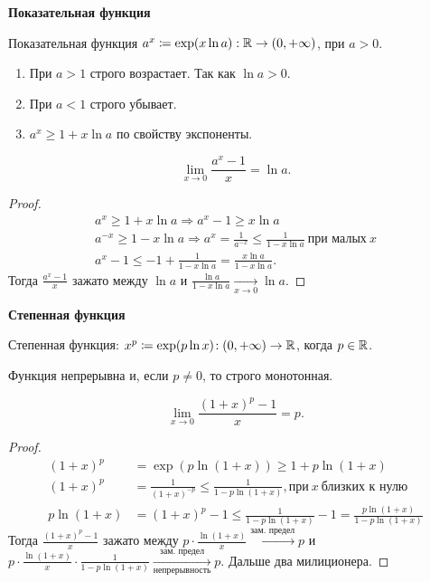 \textbf{Показательная функция}
\begin{definition}
    Показательная функция $a^x \coloneqq \exp(x \ln a): \mathbb{R} \to (0, +\infty)$, при $a > 0$.
\end{definition}
\begin{properties}
    \begin{enumerate}
        \item При $a > 1$ строго возрастает. Так как $\ln a > 0$. 
        \item При $a < 1$ строго убывает.
        \item  $a^x \ge 1 + x \ln a$ по свойству экспоненты.
    \end{enumerate}
\end{properties}
\begin{theorem}
     \[
         \lim_{x \to 0} \frac{a^x - 1}{x} = \ln a
    .\] 
\end{theorem}
\begin{proof}
    \begin{align*}
        a^x \ge 1 + x \ln a \Rightarrow  a^x - 1 \ge x \ln a \\
        a^{-x} \ge 1 - x \ln a \Rightarrow a^x = \frac{1}{a^{-x}} \le \frac{1}{1 - x \ln a}\ \text{при малых}\ x \\
        a^x - 1 \le -1 + \frac{1}{1 - x \ln a} = \frac{x \ln a}{1 - x \ln a}.
        \end{align*}
        Тогда $\frac{a^x - 1}{x}$ зажато между $\ln a$ и  $\frac{\ln a}{1 - x \ln a} \xrightarrow[x \to 0]{} \ln a$. 
\end{proof}

\textbf{Степенная функция}
\begin{definition}
    Степенная функция: $x^p \coloneqq \exp(p \ln x)\!: (0, +\infty) \to \mathbb{R}$, когда  $p \in \mathbb{R}$.

    Функция непрерывна и, если  $p \neq 0$, то строго монотонная.
\end{definition}

\begin{theorem}
    \[
        \lim_{x\to 0} \frac{(1+x)^p - 1}{x} = p
    .\] 
\end{theorem}
\begin{proof}
    \begin{align*}
        (1+x)^p &= \exp(p \ln(1+x))  \ge 1 + p \ln(1+x) \\
        (1+x)^p &= \frac{1}{(1+x)^{-p}} \le \frac{1}{1 - p \ln (1+x)}, \text{при}\ x\ \text{близких к нулю}\\
        p \ln (1+x) &= (1+x)^p - 1 \le \frac{1}{1-p\ln(1+x)} - 1 = \frac{p\ln(1+x)}{1 - p \ln(1+x)}
    \end{align*}
    Тогда $\frac{(1+x)^p - 1}{x}$ зажато между $p \cdot \frac{\ln(1+x)}{x} \xrightarrow{\text{зам. предел}}p$ и $p \cdot \frac{\ln(1+x)}{x} \cdot \frac{1}{1 - p \ln (1+x)} \xrightarrow [\text{непрерывность}]{\text{зам. предел}} p$. Дальше два милиционера.
\end{proof}

